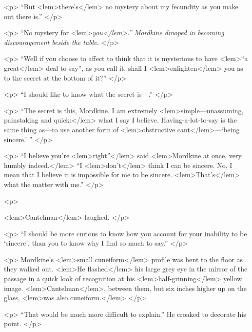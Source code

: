 {{				<p>
				“But 
<lem>there's</lem>
					{} 
				no mystery about my fecundity as you make out there is.” 
 				</p> 

				<p>
				“No mystery for 
<lem>\emph{you</lem>.” Mordkine drooped in becoming discouragement beside the table.}
					{} 
 				</p> 

				<p>
				“Well if you choose to affect to think that it is mysterious to have  
<lem>“a great</lem>
					{} deal to 
				say”, as you call it, shall I 
<lem>enlighten</lem>
					{} 
				you as to the secret at the bottom of it?” 
 				</p> 

				<p>
				“I should like to know what the secret is---.” 
 				</p> 

				<p>
				“The secret is this, Mordkine. I am extremely 
<lem>simple---unassuming, painstaking and quick:</lem>
					{} 
				what I say I believe. Having-a-lot-to-say is the same thing as---to use 
				another form of 
<lem>obstructive cant</lem>{}---`being 
				sincere.' ” 
 				</p> 

				<p>
				“I believe you're 
<lem>right”</lem>
					{} 
				said 
<lem>Mordkine at once, very humbly indeed.</lem>
					{} 
				“I 
<lem>don't</lem>{} think I can be sincere. No, I 
				mean that I believe it is impossible for me to be sincere. 
<lem>That's</lem>{} what the matter with me.” 
 				</p> 

				<p>
				
<lem>Cantelman</lem>{} laughed. 
 				</p> 

				<p>
				“I should be more curious to know how you account for your inability  to be `sincere', 
				than you to know why I find so much to say.” 
 				</p> 

				<p>
				Mordkine's 
<lem>small cuneiform</lem>
					{} 
				profile was bent to the floor as they walked out. 
<lem>He flashed</lem>
					{} 
				his large grey eye in the mirror of the passage in a quick look of recognition at 
				his 
<lem>half-grinning</lem>
					{} 
				yellow image. 
<lem>Cantelman</lem>{}, between them, but six inches higher up 
				on the glass, 
<lem>was also cuneiform.</lem>
					{} 
 				</p> 

				<p>
				“That would be much more difficult to explain.” He croaked to decorate his point. 
 				</p> 

}}
